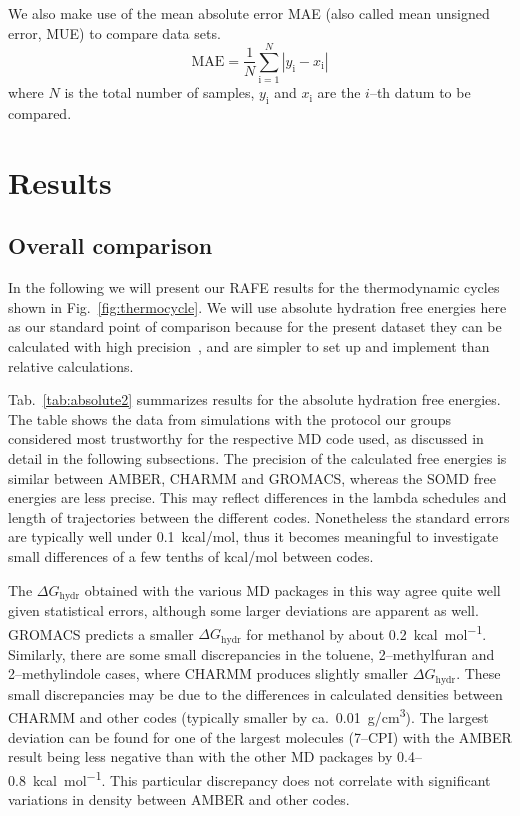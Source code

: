 \documentclass[journal=jctcce,manuscript=article]{achemso}
\begin{document}
We also make use of the mean absolute error MAE (also called mean unsigned
error, MUE) to compare data sets.
\begin{equation}
\label{eq:MUE}
\mathrm{MAE} = \frac{1}{N}\sum_\mathrm{i=1}^N \left | y_\mathrm{i} -
x_\mathrm{i} \right |
\end{equation}
where $N$ is the total number of samples, $y_\mathrm{i}$ and $x_\mathrm{i}$ are
the $i$--th datum to be compared.


\section{Results}
\label{sec:results}

\subsection{Overall comparison}

In the following we will present our RAFE results for the
thermodynamic cycles shown in Fig.~\ref{fig:thermocycle}.  We will use
absolute hydration free energies here as our standard point of
comparison because for the present dataset they can be calculated with
high precision~\cite{doi:10.1021/acs.jced.7b00104}, and are simpler to
set up and implement than relative calculations.  

Tab.~\ref{tab:absolute2} summarizes results for the absolute hydration
free energies.  The table shows the data
from simulations with the protocol our groups considered most trustworthy for the respective MD code used, as discussed in detail in the following subsections.
The  precision of the calculated free energies is similar between
AMBER, CHARMM and GROMACS, whereas the SOMD free energies are less
precise.  This may reflect differences in the lambda schedules and
length of trajectories between the different codes.  Nonetheless the
standard errors are typically well under \SI{0.1}{kcal/mol}, thus it
becomes meaningful to investigate small differences of a few tenths of
\si{kcal/mol} between codes.

The $\Delta G_{\mathrm{hydr}}$
obtained with the various MD packages in
this way agree quite well given statistical errors, although some larger deviations are apparent as
well.  GROMACS predicts a smaller $\Delta G_{\mathrm{hydr}}$ for
methanol by about \SI{+0.2}{kcal.mol^{-1}}.  Similarly, there are some
small discrepancies in the toluene, 2--methylfuran and 2--methylindole
cases, where CHARMM produces slightly smaller $\Delta
G_{\mathrm{hydr}}$.  These small discrepancies may be due to the
differences in calculated densities between CHARMM and other codes
(typically smaller by ca.\ \SI{0.01}{g/cm^3}).
The largest deviation can be found for one of the largest
molecules (7--CPI) with the AMBER result being less negative than with
the other MD packages by 0.4--\SI{0.8}{kcal.mol^{-1}}.  This
particular discrepancy does not correlate with significant variations
in density between AMBER and other codes.
\end{document}
